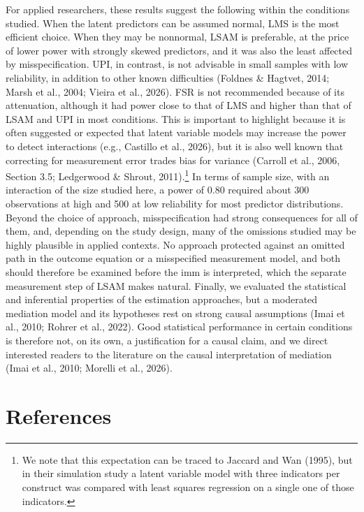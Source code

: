 \documentclass[
  man,
  longtable,
  nolmodern,
  notxfonts,
  notimes,
  colorlinks=true,linkcolor=blue,citecolor=blue,urlcolor=blue]{apa7}
\begin{document}
For applied researchers, these results suggest the following within the
conditions studied. When the latent predictors can be assumed normal,
LMS is the most efficient choice. When they may be nonnormal, LSAM is
preferable, at the price of lower power with strongly skewed predictors,
and it was also the least affected by misspecification. UPI, in
contrast, is not advisable in small samples with low reliability, in
addition to other known difficulties (Foldnes \& Hagtvet, 2014; Marsh et
al., 2004; Vieira et al., 2026). FSR is not recommended because of its
attenuation, although it had power close to that of LMS and higher than
that of LSAM and UPI in most conditions. This is important to highlight
because it is often suggested or expected that latent variable models
may increase the power to detect interactions (e.g., Castillo et al.,
2026), but it is also well known that correcting for measurement error
trades bias for variance (Carroll et al., 2006, Section 3.5; Ledgerwood
\& Shrout, 2011).\footnote{We note that this expectation can be traced
  to Jaccard and Wan (1995), but in their simulation study a latent
  variable model with three indicators per construct was compared with
  least squares regression on a single one of those indicators.} In
terms of sample size, with an interaction of the size studied here, a
power of 0.80 required about 300 observations at high and 500 at low
reliability for most predictor distributions. Beyond the choice of
approach, misspecification had strong consequences for all of them, and,
depending on the study design, many of the omissions studied may be
highly plausible in applied contexts. No approach protected against an
omitted path in the outcome equation or a misspecified measurement
model, and both should therefore be examined before the imm is
interpreted, which the separate measurement step of LSAM makes natural.
Finally, we evaluated the statistical and inferential properties of the
estimation approaches, but a moderated mediation model and its
hypotheses rest on strong causal assumptions (Imai et al., 2010; Rohrer
et al., 2022). Good statistical performance in certain conditions is
therefore not, on its own, a justification for a causal claim, and we
direct interested readers to the literature on the causal interpretation
of mediation (Imai et al., 2010; Morelli et al., 2026).

\newpage{}

\section{References}\label{references}
\end{document}
